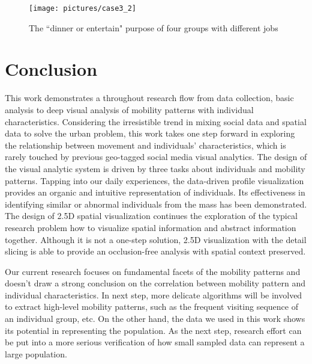 \begin{figure}[htb!]
 \centering %
 \texttt{[image: pictures/case3\_2]}
 \caption{The ``dinner or entertain" purpose of four groups with different jobs}
 \label{case32}
\end{figure}

\section{Conclusion}
\label{sec:conclusion}

This work demonstrates a throughout research flow from data collection, basic analysis to deep visual analysis of mobility patterns with individual characteristics. Considering the irresistible trend in mixing social data and spatial data to solve the urban problem, this work takes one step forward in exploring the relationship between movement and individuals' characteristics, which is rarely touched by previous geo-tagged social media visual analytics. The design of the visual analytic system is driven by three tasks about individuals and mobility patterns. Tapping into our daily experiences, the data-driven profile visualization provides an organic and intuitive representation of individuals. Its effectiveness in identifying similar or abnormal individuals from the mass has been demonstrated. The design of 2.5D spatial visualization continues the exploration of the typical research problem how to visualize spatial information and abstract information together. Although it is not a one-step solution, 2.5D visualization with the detail slicing is able to provide an occlusion-free analysis with spatial context preserved.

Our current research focuses on fundamental facets of the mobility patterns and doesn't draw a strong conclusion on the correlation between mobility pattern and individual characteristics. In next step, more delicate algorithms will be involved to extract high-level mobility patterns, such as the frequent visiting sequence of an individual group, etc. On the other hand, the data we used in this work shows its potential in representing the population. As the next step, research effort can be put into a more serious verification of how small sampled data can represent a large population.



%




